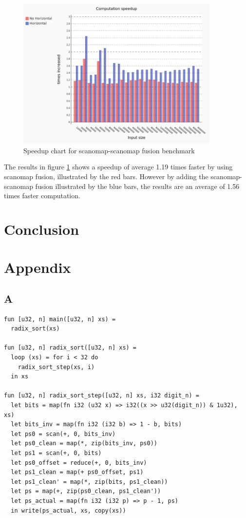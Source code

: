 \documentclass[11pt]{article}
\begin{document}
\begin{figure}[hb]
  \centering
    \includegraphics[width=0.9\textwidth]{images/horri-comparing.png}
  \caption{Speedup chart for scanomap-scanomap fusion benchmark}
  \label{fig:scanomap-scanomap}
\end{figure}

The results in figure \ref{fig:scanomap-scanomap} shows a speedup of average 1.19 times faster by using scanomap fusion, illustrated by the red bars. However by adding the scanomap-scanomap fusion illustrated by the blue bars, the results are an average of 1.56 times faster computation.

\clearpage
\section{Conclusion}
\newpage




\newpage
\section{Appendix}
\subsection{A}
\begin{lstlisting}[caption=Test program] 
fun [u32, n] main([u32, n] xs) =
  radix_sort(xs)

fun [u32, n] radix_sort([u32, n] xs) =
  loop (xs) = for i < 32 do
    radix_sort_step(xs, i)
  in xs

fun [u32, n] radix_sort_step([u32, n] xs, i32 digit_n) =
  let bits = map(fn i32 (u32 x) => i32((x >> u32(digit_n)) & 1u32), xs)
  let bits_inv = map(fn i32 (i32 b) => 1 - b, bits)
  let ps0 = scan(+, 0, bits_inv)
  let ps0_clean = map(*, zip(bits_inv, ps0))
  let ps1 = scan(+, 0, bits)
  let ps0_offset = reduce(+, 0, bits_inv)
  let ps1_clean = map(+ ps0_offset, ps1)
  let ps1_clean' = map(*, zip(bits, ps1_clean))
  let ps = map(+, zip(ps0_clean, ps1_clean'))
  let ps_actual = map(fn i32 (i32 p) => p - 1, ps)
  in write(ps_actual, xs, copy(xs))

\end{lstlisting}
\end{document}
